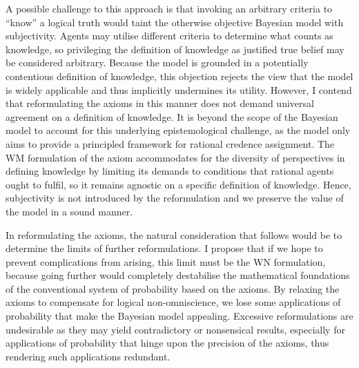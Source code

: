 \documentclass[12pt]{article}
\begin{document}
A possible challenge to this approach is that invoking an arbitrary criteria to ``know'' a logical truth would taint the otherwise objective Bayesian model with subjectivity. Agents may utilise different criteria to determine what counts as knowledge, so privileging the definition of knowledge as justified true belief may be considered arbitrary. Because the model is grounded in a potentially contentious definition of knowledge, this objection rejects the view that the model is widely applicable and thus implicitly undermines its utility. However, I contend that reformulating the axioms in this manner does not demand universal agreement on a definition of knowledge. It is beyond the scope of the Bayesian model to account for this underlying epistemological challenge, as the model only aims to provide a principled framework for rational credence assignment. The WM formulation of the axiom accommodates for the diversity of perspectives in defining knowledge by limiting its demands to conditions that rational agents ought to fulfil, so it remains agnostic on a specific definition of knowledge. Hence, subjectivity is not introduced by the reformulation and we preserve the value of the model in a sound manner.

In reformulating the axioms, the natural consideration that follows would be to determine the limits of further reformulations. I propose that if we hope to prevent complications from arising, this limit must be the WN formulation, because going further would completely destabilise the mathematical foundations of the conventional system of probability based on the axioms. By relaxing the axioms to compensate for logical non-omniscience, we lose some applications of probability that make the Bayesian model appealing.\autocite[436]{oup} Excessive reformulations are undesirable as they may yield contradictory or nonsensical results, especially for applications of probability that hinge upon the precision of the axioms, thus rendering such applications redundant.
\end{document}
